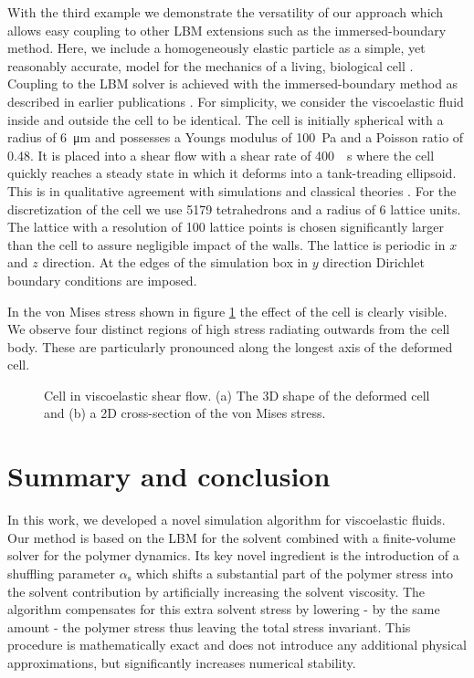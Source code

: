 \documentclass[a4paper,12pt]{scrartcl}
\begin{document}
With the third example we demonstrate the versatility of our approach which allows easy coupling to other LBM extensions such as the immersed-boundary method.
Here, we include a homogeneously elastic particle as a simple, yet reasonably accurate, model for the mechanics of a living, biological cell \cite{Wohlrab.2023}.
Coupling to the LBM solver is achieved with the immersed-boundary method as described in earlier publications \cite{Mueller.2021}.
For simplicity, we consider the viscoelastic fluid inside and outside the cell to be identical.
The cell is initially spherical with a radius of \SI{6}{\micro\meter} and possesses a Youngs modulus of \SI{100}{\pascal} and a Poisson ratio of \num{0.48}.
It is placed into a shear flow with a shear rate of \SI{400}{\per\second} where the cell quickly reaches a steady state in which it deforms into a tank-treading ellipsoid.
This is in qualitative agreement with simulations \cite{Mueller.2021} and classical theories \cite{Roscoe.1967}.
For the discretization of the cell we use \num{5179} tetrahedrons and a radius of 6 lattice units.
The lattice with a resolution of \num{100} lattice points is chosen significantly larger than the cell to assure negligible impact of the walls.
The lattice is periodic in $x$ and $z$ direction.
At the edges of the simulation box in $y$ direction Dirichlet boundary conditions are imposed.

In the von Mises stress shown in figure \ref{fig:cellInShear_vM} the effect of the cell is clearly visible.
We observe four distinct regions of high stress radiating outwards from the cell body.
These are particularly pronounced along the longest axis of the deformed cell.

	\begin{figure}[H]
		\centering
		\caption{Cell in viscoelastic shear flow. (a) The 3D shape of the deformed cell and (b) a 2D cross-section of the von Mises stress.}
		\label{fig:cellInShear_vM}
	\end{figure}


\section{Summary and conclusion}

In this work, we developed a novel simulation algorithm for viscoelastic fluids.
Our method is based on the LBM for the solvent combined with a finite-volume solver for the polymer dynamics.
Its key novel ingredient is the introduction of a shuffling parameter $\alpha_\text{s}$ which shifts a substantial part of the polymer stress into the solvent contribution by artificially increasing the solvent viscosity.
The algorithm compensates for this extra solvent stress by lowering - by the same amount - the polymer stress thus leaving the total stress invariant.
This procedure is mathematically exact and does not introduce any additional physical approximations, but significantly increases numerical stability.
\end{document}
